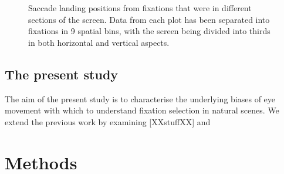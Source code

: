 \documentclass[a4paper, onecolumn, oneside, 11pt]{article}
\begin{document}
\begin{figure}
\caption{Saccade landing positions from fixations that were in different sections of the screen. Data from each plot has been separated into fixations in 9 spatial bins, with the screen being divided into thirds in both horizontal and vertical aspects.}
\label{fig:empiricalSaccadicFlow}
\end{figure}



\subsection{The present study}
The aim of the present study is to characterise the underlying biases of eye movement with which to understand fixation selection in natural scenes. We extend the previous work by examining [XXstuffXX] and 

\section{Methods}
\end{document}
